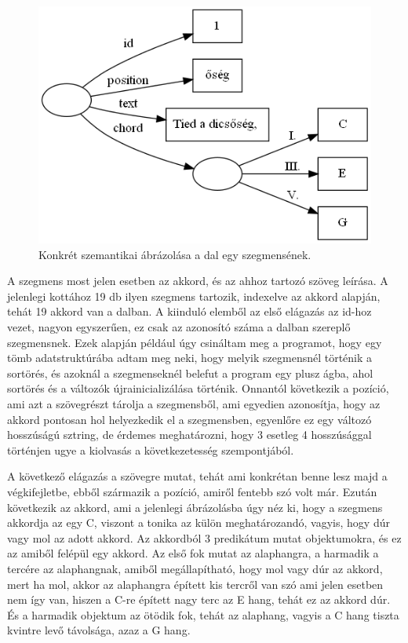 \begin{figure}[h]
	\includegraphics[scale=0.5]{images/img_src/rdf_graph_2.png}
	\caption{Konkrét szemantikai ábrázolása a dal egy szegmensének.}
	\label{fig:graph2}
\end{figure}

A szegmens most jelen esetben az akkord, és az ahhoz tartozó szöveg leírása. A jelenlegi kottához 19 db ilyen szegmens tartozik, indexelve az akkord alapján, tehát 19 akkord van a dalban. A kiinduló elemből az első elágazás az id-hoz vezet, nagyon egyszerűen, ez csak az azonosító száma a dalban szereplő szegmensnek. Ezek alapján például úgy csináltam meg a programot, hogy egy tömb adatstruktúrába adtam meg neki, hogy melyik szegmensnél történik a sortörés, és azoknál a szegmenseknél belefut a program egy plusz ágba, ahol sortörés és a változók újrainicializálása történik. Onnantól következik a pozíció, ami azt a szövegrészt tárolja a szegmensből, ami egyedien azonosítja, hogy az akkord pontosan hol helyezkedik el a szegmensben, egyenlőre ez egy változó hosszúságú sztring, de érdemes meghatározni, hogy 3 esetleg 4 hosszúsággal történjen ugye a kiolvasás a következetesség szempontjából. 

A következő elágazás a szövegre mutat, tehát ami konkrétan benne lesz majd a végkifejletbe, ebből származik a pozíció, amiről fentebb szó volt már. Ezután következik az akkord, ami a jelenlegi ábrázolásba úgy néz ki, hogy a szegmens akkordja az egy C, viszont a tonika az külön meghatározandó, vagyis, hogy dúr vagy mol az adott akkord. Az akkordból 3 predikátum mutat objektumokra, és ez az amiből felépül egy akkord. Az első fok mutat az alaphangra, a harmadik a tercére az alaphangnak, amiből megállapítható, hogy mol vagy dúr az akkord, mert ha mol, akkor az alaphangra épített kis tercről van szó ami jelen esetben nem így van, hiszen a C-re épített nagy terc az E hang, tehát ez az akkord dúr. És a harmadik objektum az ötödik fok, tehát az alaphang, vagyis a C hang tiszta kvintre levő távolsága, azaz a G hang.

